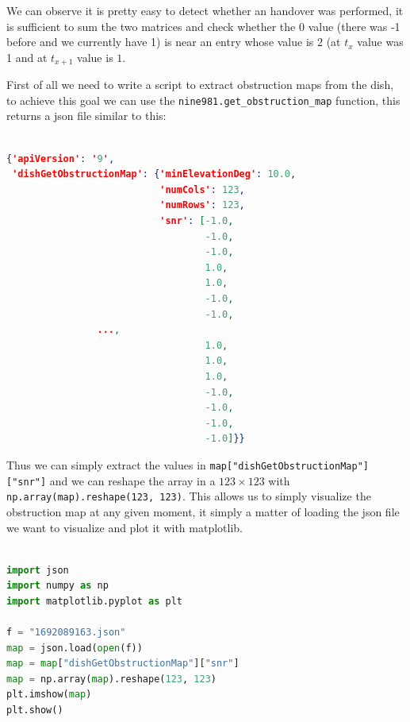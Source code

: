 \documentclass[IN,11pt,twoside,openright,bachelor,english]{tumthesis}
\begin{document}
We can observe it is pretty easy to detect whether an handover was performed, it is sufficient to sum the two matrices and check whether the $0$ value (there was -1 before and we currently have 1) is near an entry whose value is $2$ (at $t_{x}$ value was 1 and at $t_{x+1}$ value is $1$. 



First of all we need to write a script to extract obstruction maps from the dish, to achieve this goal we can use the \texttt{nine981.get\_obstruction\_map} function, this returns a json file similar to this:

\begin{lstlisting}[language=json,caption={data from the \texttt{dish\_get\_obstruction\_map} function},captionpos=b]

{'apiVersion': '9',
 'dishGetObstructionMap': {'minElevationDeg': 10.0,
                           'numCols': 123,
                           'numRows': 123,
                           'snr': [-1.0,
                                   -1.0,
                                   -1.0,
                                   1.0,
                                   1.0,
                                   -1.0,
                                   -1.0,
				...,
                                   1.0,
                                   1.0,
                                   1.0,
                                   -1.0,
                                   -1.0,
                                   -1.0,
                                   -1.0]}}  
\end{lstlisting}

Thus we can simply extract the values in \texttt{map["dishGetObstructionMap"]["snr"]} and we can reshape the array in a $123\times123$ with \texttt{np.array(map).reshape(123, 123)}. This allows us to simply visualize the obstruction map at any given moment, it simply a matter of loading the json file we want to visualize and plot it with matplotlib.

\begin{lstlisting}[language=python,caption={visualizing a single obstruction map},captionpos=b]

import json
import numpy as np
import matplotlib.pyplot as plt

f = "1692089163.json"
map = json.load(open(f))
map = map["dishGetObstructionMap"]["snr"]
map = np.array(map).reshape(123, 123)
plt.imshow(map)
plt.show()
\end{lstlisting}
\end{document}
